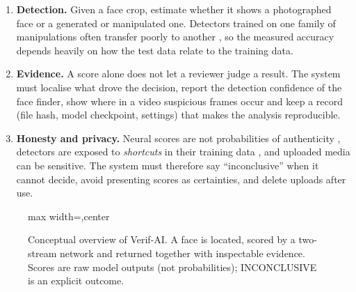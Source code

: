 \begin{enumerate}
\item \textbf{Detection.} Given a face crop, estimate whether it shows a photographed face or a generated or manipulated one. Detectors
trained on one family of manipulations often transfer poorly to another \citep{wang2020cnn,ojha2023universal,corvi2023diffusion}, so the
measured accuracy depends heavily on how the test data relate to the training data.
\item \textbf{Evidence.} A score alone does not let a reviewer judge a result. The system must localise what drove the decision, report the
detection confidence of the face finder, show where in a video suspicious frames occur and keep a record (file hash, model checkpoint,
settings) that makes the analysis reproducible.
\item \textbf{Honesty and privacy.} Neural scores are not probabilities of authenticity \citep{guo2017calibration}, detectors are exposed to
\emph{shortcuts} in their training data \citep{geirhos2020shortcut}, and uploaded media can be sensitive. The system must therefore say
``inconclusive'' when it cannot decide, avoid presenting scores as certainties, and delete uploads after use.
\end{enumerate}

\begin{figure}[ht]
\centering
\begin{adjustbox}{max width=\linewidth,center}
\end{adjustbox}
\caption[Conceptual overview of Verif-AI]{Conceptual overview of Verif-AI. A face is located, scored by a two-stream network and returned together with inspectable
evidence. Scores are raw model outputs (not probabilities); INCONCLUSIVE is an explicit outcome.}
\label{fig:overview}
\end{figure}

